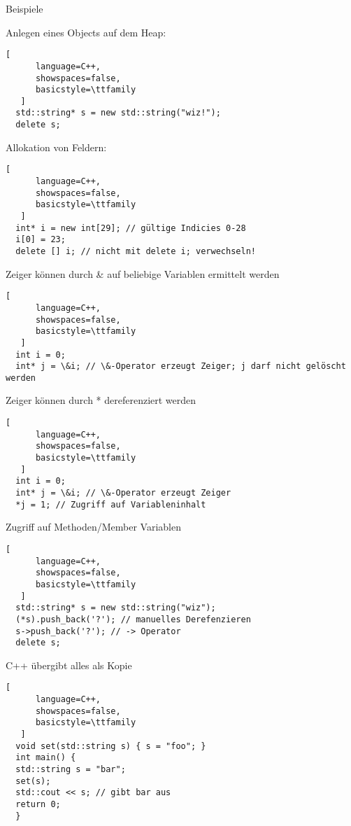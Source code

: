 \documentclass[10pt]{article}
\begin{document}
\begin{itemize*}
Beispiele
\begin{itemize*}
  \item Anlegen eines Objects auf dem Heap:
  \begin{lstlisting}[
      language=C++,
      showspaces=false,
      basicstyle=\ttfamily
   ]
  std::string* s = new std::string("wiz!");
  delete s;
  \end{lstlisting}
  
  \item Allokation von Feldern:
  \begin{lstlisting}[
      language=C++,
      showspaces=false,
      basicstyle=\ttfamily
   ]
  int* i = new int[29]; // gültige Indicies 0-28
  i[0] = 23;
  delete [] i; // nicht mit delete i; verwechseln!
  \end{lstlisting}
  
  \item Zeiger können durch \& auf beliebige Variablen ermittelt werden
  \begin{lstlisting}[
      language=C++,
      showspaces=false,
      basicstyle=\ttfamily
   ]
  int i = 0;
  int* j = \&i; // \&-Operator erzeugt Zeiger; j darf nicht gelöscht werden
  \end{lstlisting}
  
  \item Zeiger können durch * dereferenziert werden
  \begin{lstlisting}[
      language=C++,
      showspaces=false,
      basicstyle=\ttfamily
   ]
  int i = 0;
  int* j = \&i; // \&-Operator erzeugt Zeiger
  *j = 1; // Zugriff auf Variableninhalt
  \end{lstlisting}
  
  \item Zugriff auf Methoden/Member Variablen
  \begin{lstlisting}[
      language=C++,
      showspaces=false,
      basicstyle=\ttfamily
   ]
  std::string* s = new std::string("wiz");
  (*s).push_back('?'); // manuelles Derefenzieren
  s->push_back('?'); // -> Operator
  delete s;
  \end{lstlisting}
  
  \item C++ übergibt alles als Kopie
  \begin{lstlisting}[
      language=C++,
      showspaces=false,
      basicstyle=\ttfamily
   ]
  void set(std::string s) { s = "foo"; }
  int main() {
  std::string s = "bar";
  set(s);
  std::cout << s; // gibt bar aus
  return 0;
  }
  \end{lstlisting}
  

\end{itemize*}
\end{itemize*}
\end{document}
